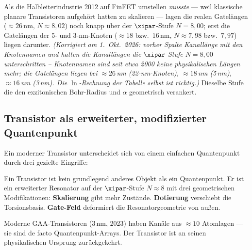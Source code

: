 Als die Halbleiterindustrie 2012 auf FinFET umstellen \emph{musste}
--- weil klassische planare Transistoren aufgehört hatten zu skalieren
--- lagen die realen Gatelängen ($\approx 26$\,nm, $N \approx 8{,}02$) noch knapp über der $\xipar$-Stufe $N = 8{,}00$; erst die Gatelängen der 5- und 3-nm-Knoten ($\approx 18$ bzw.\ $16$\,nm, $N \approx 7{,}98$ bzw.\ $7{,}97$) liegen darunter. \textit{(Korrigiert am 1.~Okt.~2026: vorher Spalte \glqq Kanallänge\grqq{} mit den Knotennamen und \glqq hatten die Kanallängen die $\xipar$-Stufe $N = 8{,}00$ unterschritten\grqq{} -- Knotennamen sind seit etwa 2000 keine physikalischen Längen mehr; die Gatelängen liegen bei $\approx 26$\,nm (22-nm-Knoten), $\approx 18$\,nm (5\,nm), $\approx 16$\,nm (3\,nm). Die $\ln$-Rechnung der Tabelle selbst ist richtig.)}
Dieselbe Stufe die den exzitonischen Bohr-Radius und $\alpha$
geometrisch verankert.

\subsection{Transistor als erweiterter, modifizierter Quantenpunkt}

Ein moderner Transistor unterscheidet sich von einem einfachen
Quantenpunkt durch drei gezielte Eingriffe:

\begin{center}
\end{center}

\begin{keyresult}
Ein Transistor ist kein grundlegend anderes Objekt als ein Quantenpunkt.
Er ist ein erweiterter Resonator auf der $\xipar$-Stufe $N \approx 8$
mit drei geometrischen Modifikationen:
\textbf{Skalierung} gibt mehr Zustände.
\textbf{Dotierung} verschiebt die Torsionsbasis.
\textbf{Gate-Feld} deformiert die Resonatorgeometrie von außen.

Moderne GAA-Transistoren (3\,nm, 2023) haben Kanäle aus
$\approx 10$ Atomlagen --- sie sind de facto Quantenpunkt-Arrays.
Der Transistor ist an seinen physikalischen Ursprung zurückgekehrt.
\end{keyresult}

